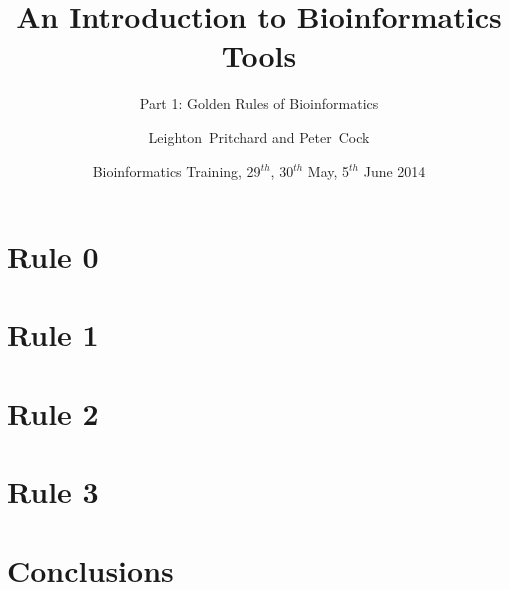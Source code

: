 
%



\title[Intro to Bioinformatics] %
{An Introduction to Bioinformatics Tools}
\subtitle{Part 1: Golden Rules of Bioinformatics}
\author[Pritchard, Cock] %
{Leighton~Pritchard and Peter~Cock}
\date[May, June 2014] %
{Bioinformatics Training, 29$^{th}$, 30$^{th}$ May, 5$^{th}$ June 2014}
\subject{Bioinformatics}





\frame[plain]{\titlepage}
  

    
\section{Rule 0}
  

\section{Rule 1}
  
    

\section{Rule 2}
  
    

\section{Rule 3}
  
    

%


\section{Conclusions}
    

